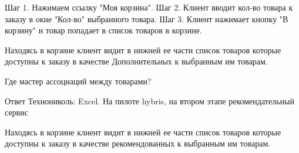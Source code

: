 {

\begin{wiki}
Шаг 1. Нажимаем ссылку "Моя корзина".
Шаг 2. Клиент вводит кол-во товара к заказу в окне "Кол-во" выбранного товара.
Шаг 3. Клиент нажимает кнопку "В корзину" и товар попадает в список товаров в корзине.

Находясь в корзине клиент видит в нижней ее части список товаров которые доступны к заказу в качестве Дополнительных к выбранным им товарам.
\end{wiki}

\begin{hybris}
Где мастер ассоциаций между товарами?

Ответ Технониколь: Excel. На пилоте hybris, на втором этапе рекомендательный сервис
\end{hybris}


\begin{itogo}
Находясь в корзине клиент видит в нижней ее части список товаров которые доступны к заказу в качестве рекомендованных к выбранным им товарам.
\end{itogo}

}



